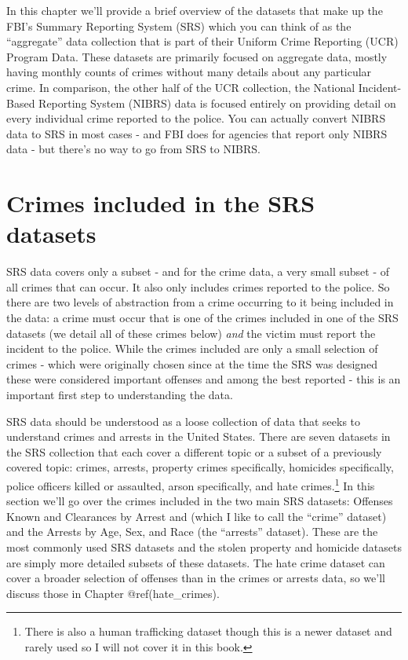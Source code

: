 \documentclass[
  12pt,
  openany]{book}
\begin{document}
In this chapter we'll provide a brief overview of the datasets that make up the FBI's Summary Reporting System (SRS) which you can think of as the ``aggregate'' data collection that is part of their Uniform Crime Reporting (UCR) Program Data. These datasets are primarily focused on aggregate data, mostly having monthly counts of crimes without many details about any particular crime. In comparison, the other half of the UCR collection, the National Incident-Based Reporting System (NIBRS) data is focused entirely on providing detail on every individual crime reported to the police. You can actually convert NIBRS data to SRS in most cases - and FBI does for agencies that report only NIBRS data - but there's no way to go from SRS to NIBRS.

\section{Crimes included in the SRS datasets}\label{crimes-included-in-the-srs-datasets}

SRS data covers only a subset - and for the crime data, a very small subset - of all crimes that can occur. It also only includes crimes reported to the police. So there are two levels of abstraction from a crime occurring to it being included in the data: a crime must occur that is one of the crimes included in one of the SRS datasets (we detail all of these crimes below) \emph{and} the victim must report the incident to the police. While the crimes included are only a small selection of crimes - which were originally chosen since at the time the SRS was designed these were considered important offenses and among the best reported - this is an important first step to understanding the data.

SRS data should be understood as a loose collection of data that seeks to understand crimes and arrests in the United States. There are seven datasets in the SRS collection that each cover a different topic or a subset of a previously covered topic: crimes, arrests, property crimes specifically, homicides specifically, police officers killed or assaulted, arson specifically, and hate crimes.\footnote{There is also a human trafficking dataset though this is a newer dataset and rarely used so I will not cover it in this book.} In this section we'll go over the crimes included in the two main SRS datasets: Offenses Known and Clearances by Arrest and (which I like to call the ``crime'' dataset) and the Arrests by Age, Sex, and Race (the ``arrests'' dataset). These are the most commonly used SRS datasets and the stolen property and homicide datasets are simply more detailed subsets of these datasets. The hate crime dataset can cover a broader selection of offenses than in the crimes or arrests data, so we'll discuss those in Chapter @ref(hate\_crimes).
\end{document}

